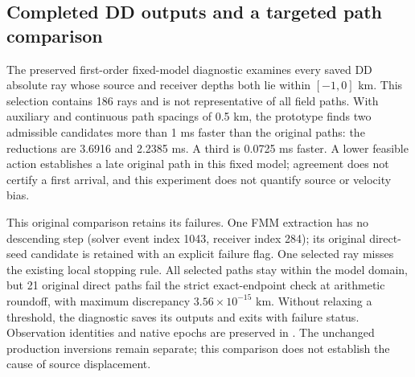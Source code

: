 \documentclass[11pt]{article}
\begin{document}
\subsection{Completed DD outputs and a targeted path comparison}

The preserved first-order fixed-model diagnostic examines every saved DD absolute ray
whose source and receiver depths both lie within $[-1,0]$ km. This selection
contains 186 rays and is not representative of all field paths. With auxiliary
and continuous path spacings of 0.5 km, the prototype finds two admissible
candidates more than 1 ms faster than the original paths: the reductions
are 3.6916 and 2.2385 ms. A third is 0.0725 ms faster. A lower feasible action
establishes a late original path in this fixed model; agreement does not
certify a first arrival, and this experiment does not quantify source or
velocity bias.

This original comparison retains its failures. One FMM extraction has no descending
step (solver event index 1043, receiver index 284); its original direct-seed
candidate is retained with an explicit failure flag. One selected ray
misses the existing local stopping rule. All selected paths stay within
the model domain, but 21 original direct paths fail the strict exact-endpoint
check at arithmetic roundoff, with maximum discrepancy
$3.56\times10^{-15}$ km. Without relaxing a threshold, the diagnostic saves
its outputs and exits with failure status. Observation identities and native
epochs are preserved in .
The unchanged production inversions remain separate; this comparison
does not establish the cause of source displacement.
\end{document}
